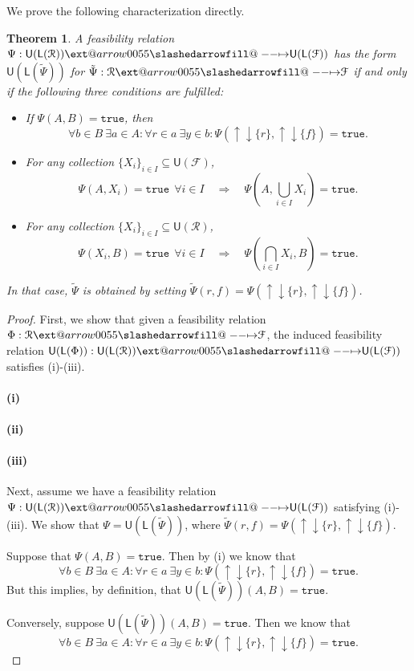 \documentclass[12pt]{article}
\makeatletter
\theoremstyle{definition}
\theoremstyle{plain}
\theoremstyle{plain}
\theoremstyle{plain}
\newtheorem{theorem}{Theorem}[section]
\theoremstyle{plain}
\theoremstyle{remark}
\theoremstyle{remark}
\newcommand{\mc}[1]{\mathcal{#1}}
\newcommand{\sub}{\subseteq}
\newcommand{\low}{\mathsf{L}}
\newcommand{\upper}{\mathsf{U}}
\newcommand{\true}{\mathtt{true}}
\newcommand{\upc}[1]{{\uparrow #1}}
\newcommand{\lwc}[1]{{\downarrow #1}}
\def\slashedarrowfill@#1#2#3#4#5{%
	$\m@th\thickmuskip0mu\medmuskip\thickmuskip\thinmuskip\thickmuskip
	\relax#5#1\mkern-7mu%
	\cleaders\hbox{$#5\mkern-2mu#2\mkern-2mu$}\hfill
	\mathclap{#3}\mathclap{#2}%
	\cleaders\hbox{$#5\mkern-2mu#2\mkern-2mu$}\hfill
	\mkern-7mu#4$%
}
\def\rightslashedarrowfill@{%
	\slashedarrowfill@\relbar\relbar\mapstochar\rightarrow}
\newcommand\xslashedrightarrow[2][]{%
	\ext@arrow 0055{\rightslashedarrowfill@}{#1}{#2}}
\makeatother
\begin{document}
We prove the following characterization directly.

\begin{theorem}\label{thm:induction}
	A feasibility relation $\Psi: \upper(\low(\mc{R})) \xslashedrightarrow{} \upper(\low(\mc{F}))$ has the form $\upper(\low(\tilde\Psi))$ for $\tilde\Psi: \mc{R} \xslashedrightarrow{} \mc{F}$ if and only if the following three conditions are fulfilled:
	\begin{itemize}
	\item[(i)] If $\Psi(A,B)=\true$, then
	$$\forall b \in B \: \exists a \in A : \forall r \in a \: \exists y \in b: \Psi(\upc{\lwc{\{r\}}},\upc{\lwc{\{f\}}})=\true.$$
	\item[(ii)] For any collection $\{X_i\}_{i \in I} \sub \upper(\mc{F})$,
	$$\Psi(A,X_i) = \true \:\: \forall i \in I \quad \Rightarrow \quad \Psi(A,\bigcup_{i \in I} X_i) = \true.$$
	\item[(iii)] For any collection $\{X_i\}_{i \in I} \sub \upper(\mc{R})$,
	$$\Psi(X_i,B) = \true \:\: \forall i \in I \quad \Rightarrow \quad \Psi(\bigcap_{i \in I}X_i,B) = \true.$$
	\end{itemize}
	In that case, $\tilde\Psi$ is obtained by setting $\tilde\Psi(r,f) = \Psi(\upc{\lwc{\{r\}}},\upc{\lwc{\{f\}}})$.
\end{theorem}
\begin{proof}
	First, we show that given a feasibility relation $\Phi: \mc{R} \xslashedrightarrow{} \mc{F}$, the induced feasibility relation $\upper(\low(\Phi)):  \upper(\low(\mc{R})) \xslashedrightarrow{} \upper(\low(\mc{F}))$ satisfies (i)-(iii).
	
	\paragraph{(i)}

	\paragraph{(ii)}
	
	\paragraph{(iii)}
	
	Next, assume we have a feasibility relation $\Psi: \upper(\low(\mc{R})) \xslashedrightarrow{} \upper(\low(\mc{F}))$ satisfying (i)-(iii). We show that $\Psi = \upper(\low(\tilde\Psi))$, where $\tilde\Psi(r,f) = \Psi(\upc{\lwc{\{r\}}},\upc{\lwc{\{f\}}})$.
	
	Suppose that $\Psi(A,B) = \true$. Then by (i) we know that $$\forall b \in B \: \exists a \in A : \forall r \in a \: \exists y \in b: \Psi(\upc{\lwc{\{r\}}},\upc{\lwc{\{f\}}})=\true.$$ But this implies, by definition, that $\upper(\low(\tilde\Psi))(A,B) = \true$.
	
	Conversely, suppose $\upper(\low(\tilde\Psi))(A,B) = \true$. Then we know that
	$$\forall b \in B \: \exists a \in A : \forall r \in a \: \exists y \in b: \Psi(\upc{\lwc{\{r\}}},\upc{\lwc{\{f\}}})=\true.$$
	
\end{proof}
\end{document}
